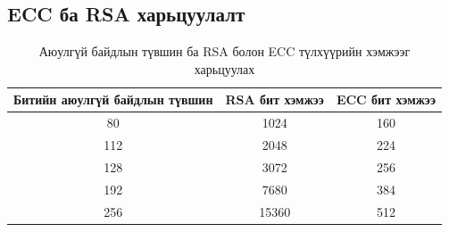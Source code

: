 \subsection{ECC ба RSA харьцуулалт}
\begin{table}[h]
	\centering
	\begin{tabular}{|c|c|c|}
	\hline
	\textbf{Битийн аюулгүй байдлын түвшин} & \textbf{RSA бит хэмжээ} & \textbf{ECC бит хэмжээ} \\ \hline
	80                          & 1024                      & 160                       \\ \hline
	112                         & 2048                      & 224                       \\ \hline
	128                         & 3072                      & 256                       \\ \hline
	192                         & 7680                      & 384                       \\ \hline
	256                         & 15360                     & 512                       \\ \hline
	\end{tabular}
	\caption{Аюулгүй байдлын түвшин ба RSA болон ECC түлхүүрийн хэмжээг харьцуулах \cite{RSAvsECC}}
	\label{tab:rsa_ecc_key_sizes}
	\end{table}
	
